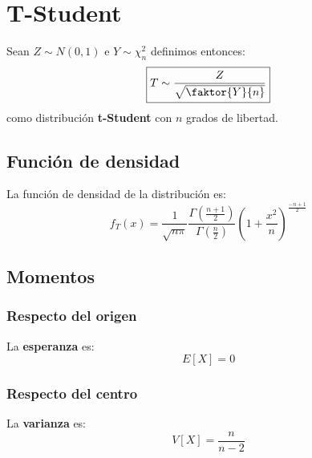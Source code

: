 \section{T-Student}
\label{sec:t_student}
Sean $Z \sim N\left( 0, 1 \right)$ e $Y \sim \chi^2_n$ definimos entonces:
\[
\boxed{T \sim \frac{Z}{\sqrt{\faktor{Y}{n}}}}
\]
como distribución \textbf{t-Student} con $n$ grados de libertad.

\subsection{Función de densidad}
La función de densidad de la distribución es:
\[
f_T \left( x \right) = \frac{1}{\sqrt{n \pi}}\frac{\Gamma\left( \frac{n + 1}{2} \right)}{\Gamma\left( \frac{n}{2} \right)} \left( 1 + \frac{x^2}{n} \right)^{\frac{-n+1}{2}}
\]

\subsection{Momentos}

\subsubsection*{Respecto del origen}
La \textbf{esperanza} es: 
\[
    E\left[ X \right] = 0
\]
\subsubsection*{Respecto del centro}
La \textbf{varianza} es:
\[
    V\left[ X \right] = \frac{n}{n-2}
\]

